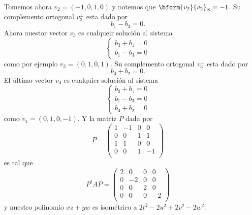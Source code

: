 	Tomemos ahora $v_2 = (-1,0,1,0)$ y notemos que $\bform{v_2}{v_2}_S = -1$. Su complemento ortogonal $v_2^\perp$ esta dado por
	\[ b_1-b_3 = 0. \]
	Ahora nuestor vector $v_3$ es cualqueir solución al sistema
	\[ \begin{cases}
	b_3+b_1 = 0 \\
	b_1-b_3 = 0
	\end{cases} \]
	como por ejemplo $v_3 = (0,1,0,1)$. Su complemento ortogonal $v_3^\perp$ esta dado por
	\[ b_4+b_2 = 0. \]
	El último vector $v_4$ es cualquier solución al sistema 
	\[ \begin{cases}
	b_3+b_1 = 0 \\
	b_1-b_3 = 0 \\
	b_4+b_2 = 0
	\end{cases} \]
	como $v_4 = (0,1,0,-1)$. Y la matriz $P$ dada por
	\[ P = \begin{pmatrix}
	1 & -1& 0& 0\\
	0 & 0& 1& 1\\
	1 & 1& 0& 0\\
	0 & 0& 1& -1\\
	\end{pmatrix} \]
	es tal que 
	\[ P^tAP =  \begin{pmatrix}
	2 & 0& 0& 0\\
	0 & -2& 0& 0\\
	0 & 0& 2& 0\\
	0 & 0& 0& -2\\
	\end{pmatrix} \]
	y nuestro polinomio $xz+yw$ es isométrico a $2t^2-2u^2+2v^2-2w^2$.

